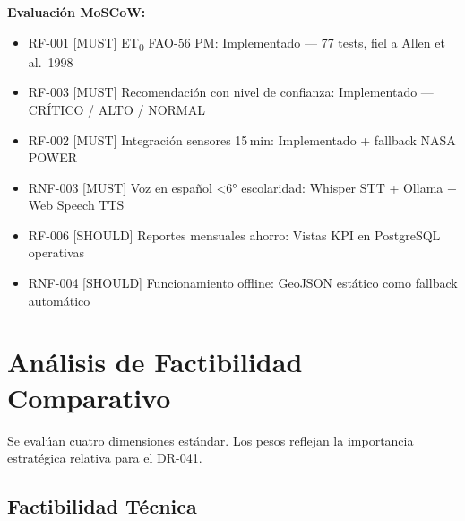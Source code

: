\documentclass[12pt,letterpaper]{article}
\newcommand{\cmark}{{\color{verdeOk}\bfseries\ding{51}}}
\begin{document}
\textbf{Evaluación MoSCoW:}
\begin{itemize}
  \item RF-001 [MUST] ET\textsubscript{0} FAO-56 PM: \cmark{} Implementado — 77 tests, fiel a Allen et al.\ 1998
  \item RF-003 [MUST] Recomendación con nivel de confianza: \cmark{} Implementado — CRÍTICO / ALTO / NORMAL
  \item RF-002 [MUST] Integración sensores 15\,min: \cmark{} Implementado + fallback NASA POWER
  \item RNF-003 [MUST] Voz en español \textless{}6° escolaridad: \cmark{} Whisper STT + Ollama + Web Speech TTS
  \item RF-006 [SHOULD] Reportes mensuales ahorro: \cmark{} Vistas KPI en PostgreSQL operativas
  \item RNF-004 [SHOULD] Funcionamiento offline: \cmark{} GeoJSON estático como fallback automático
\end{itemize}

\newpage

\section{Análisis de Factibilidad Comparativo}

Se evalúan cuatro dimensiones estándar. Los pesos reflejan la importancia estratégica
relativa para el DR-041.

\subsection{Factibilidad Técnica}
\end{document}
